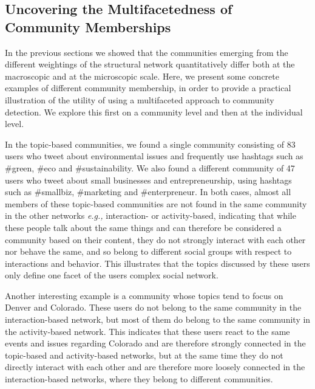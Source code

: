 \documentclass[10pt,letterpaper]{article}
\begin{document}
\subsection{Uncovering the Multifacetedness of Community Memberships}


In the previous sections we showed that the communities emerging from the different weightings of the structural network quantitatively differ both at the macroscopic and at the microscopic scale. Here, we present some concrete examples of different community membership, in order to provide a practical illustration of the utility of using a multifaceted approach to community detection. We explore this first on a community level and then at the individual level.

In the topic-based communities, we found a single community consisting of 83 users who tweet about environmental issues and frequently use hashtags such as \#green, \#eco and \#sustainability. We also found a different community of 47 users who tweet about small businesses and entrepreneurship, using hashtags such as \#smallbiz, \#marketing and \#enterpreneur. In both cases, almost all members of these topic-based communities are not found in the same community in the other networks \emph{e.g.,} interaction- or activity-based, indicating that while these people talk about the same things and can therefore be considered a community based on their content, they do not strongly interact with each other nor behave the same, and so belong to different social groups with respect to interactions and behavior. This illustrates that the topics discussed by these users only define one facet of the users complex social network. 

Another interesting example is a community whose topics tend to focus on Denver and Colorado. These users do not belong to the same community in the interaction-based network, but most of them do belong to the same community in the activity-based network. This indicates that these users react to the same events and issues regarding Colorado and are therefore strongly connected in the topic-based and activity-based networks, but at the same time they do not directly interact with each other and are therefore more loosely connected in the interaction-based networks, where they belong to different communities.
\end{document}
